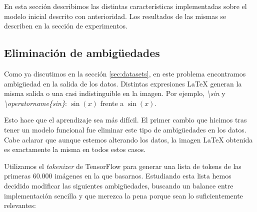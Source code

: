 \documentclass[a4paper, 20pt, dvipsnames]{article}
\begin{document}
En esta sección describimos las distintas características implementadas sobre el
modelo inicial descrito con anterioridad. Los resultados de las mismas se
describen en la sección de experimentos.


\subsection{Eliminación de ambigüedades}
\label{feature:rem-amb}

Como ya discutimos en la sección \ref{sec:datasets}, en este problema
encontramos ambigüedad en la salida de los datos. Distintas expresiones \LaTeX{}
generan la misma salida o una casi indistinguible en la imagen. Por ejemplo,
\emph{\textbackslash sin} y \emph{\textbackslash operatorname\{sin\}}: $\sin(x)$
frente a $\operatorname{sin}(x)$.

Esto hace que el aprendizaje sea más difícil. El primer cambio que hicimos tras
tener un modelo funcional fue eliminar este tipo de ambigüedades en los
datos. Cabe aclarar que aunque estemos alterando los datos, la imagen \LaTeX{}
obtenida es exactamente la misma en todos estos casos.

Utilizamos el \emph{tokenizer} de TensorFlow \cite{tokenizer} para generar una
lista de tokens de las primeras 60.000 imágenes en la que basarnos. Estudiando
esta lista hemos decidido modificar las siguientes ambigüedades, buscando un
balance entre implementación sencilla y que merezca la pena porque sean lo
suficientemente relevantes:
\end{document}

